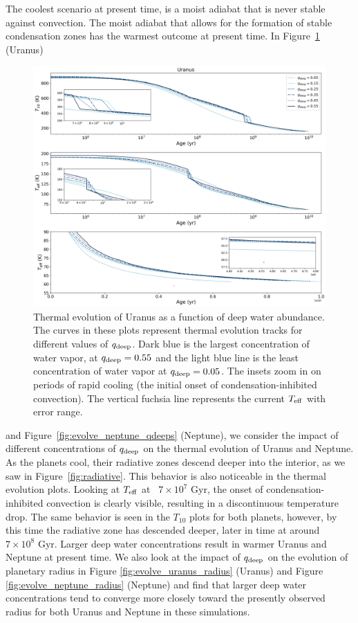 \documentclass[11pt]{ucscthesisbs}
\begin{document}
The coolest scenario at present time, is a moist adiabat that is never stable against convection. The moist adiabat that allows for the formation of stable condensation zones has the warmest outcome at present time. In Figure~\ref{fig:evolve_uranus_qdeeps} (Uranus) 
\begin{figure}[ht]
 \centerline{
  \includegraphics[width=\columnwidth]{figures/u_cooling_curves_nz_4096_more_qdeeps.png}
 }
\caption[Thermal Evolution Curves for Uranus - Water Vapor Concentration Comparisons]
{Thermal evolution of Uranus as a function of deep water abundance. The curves in these plots represent thermal evolution tracks for different values of $q_{\rm deep}$. Dark blue is the largest concentration of water vapor, at $q_{\rm deep} = 0.55$ and the light blue line is the least concentration of water vapor at $q_{\rm deep} = 0.05$. The insets zoom in on periods of rapid cooling (the initial onset of condensation-inhibited convection). The vertical fuchsia line represents the current $T_{\rm eff}$ with error range.}
\label{fig:evolve_uranus_qdeeps}
\end{figure}
and Figure~\ref{fig:evolve_neptune_qdeeps} (Neptune), we consider the impact of different concentrations of $q_{\rm deep}$ on the thermal evolution of Uranus and Neptune. As the planets cool, their radiative zones descend deeper into the interior, as we saw in Figure~\ref{fig:radiative}. This behavior is also noticeable in the thermal evolution plots. Looking at $T_{\rm eff}$ at ~$7 \times 10^7$ Gyr, the onset of condensation-inhibited convection is clearly visible, resulting in a discontinuous temperature drop. The same behavior is seen in the $T_{10}$ plots for both planets, however, by this time the radiative zone has descended deeper, later in time at around ~$7 \times 10^8$ Gyr. Larger deep water concentrations result in warmer Uranus and Neptune at present time. We also look at the impact of $q_{\rm deep}$ on the evolution of planetary radius in Figure \ref{fig:evolve_uranus_radius} (Uranus) and Figure \ref{fig:evolve_neptune_radius} (Neptune) and find that larger deep water concentrations tend to converge more closely toward the presently observed radius for both Uranus and Neptune in these simulations. 
\end{document}
